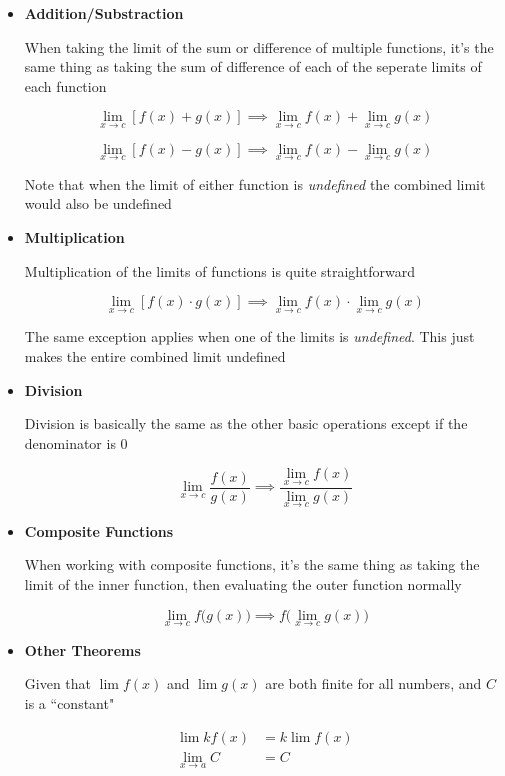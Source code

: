 \documentclass[12pt]{article}
\newcommand{\uit}[1]{\textit{#1}}
\begin{document}
    \begin{itemize}
        
        \item \textbf{Addition/Substraction}
        
        When taking the limit of the sum or difference of multiple functions, it's the 
        same thing as taking the sum of difference of each of the seperate limits of each function
        
        \[
            \lim_{x \to c} [f(x) + g(x)] \implies \lim_{x \to c} f(x) + \lim_{x \to c} g(x)   
        \]

        \[
            \lim_{x \to c} [f(x) - g(x)] \implies \lim_{x \to c} f(x) - \lim_{x \to c} g(x)
        \]

        Note that when the limit of either function is \uit{undefined} the combined
        limit would also be undefined

        \item \textbf{Multiplication}
        
        Multiplication of the limits of functions is quite straightforward
        
        \[
            \lim_{x \to c} [f(x) \cdot g(x)] \implies \lim_{x \to c} f(x) \cdot \lim_{x \to c} g(x)    
        \]

        The same exception applies when one of the limits is \uit{undefined}. This just makes
        the entire combined limit undefined

        \item \textbf{Division}
        
        Division is basically the same as the other basic operations except if the denominator is 0

        \[
            \lim_{x \to c} \frac{f(x)}{g(x)} \implies \frac{\lim_{x \to c} f(x)}{\lim_{x \to c} g(x)}   
        \]

        \item \textbf{Composite Functions}
        
        When working with composite functions, it's the same thing as taking
        the limit of the inner function, then evaluating the outer function normally

        \[
            \lim_{x \to c} f\bigg(g(x)\bigg) \implies f\bigg(\lim_{x \to c} g(x)\bigg)    
        \]

        \item \textbf{Other Theorems}
        
        Given that $\lim f(x)$ and $\lim g(x)$ are both finite for all numbers, and $C$ is a ``constant"

        \[
            \begin{aligned}
                \lim kf(x) &= k \lim f(x) \\
                \lim_{x \to a} C &= C 
            \end{aligned}    
        \]

    \end{itemize}
\end{document}
